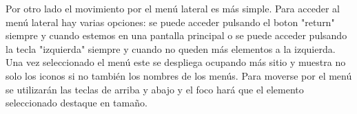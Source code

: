 Por otro lado el movimiento por el menú lateral es más simple. Para acceder al menú lateral hay varias opciones: se puede acceder pulsando el boton "return" siempre y 
cuando estemos en una pantalla principal o se puede acceder pulsando la tecla "izquierda" siempre y cuando no queden más elementos a la izquierda. Una vez seleccionado
el menú este se despliega ocupando más sitio y muestra no solo los iconos si no también los nombres de los menús. Para moverse por el menú se utilizarán las teclas de 
arriba y abajo y el foco hará que el elemento seleccionado destaque en tamaño. 

\be